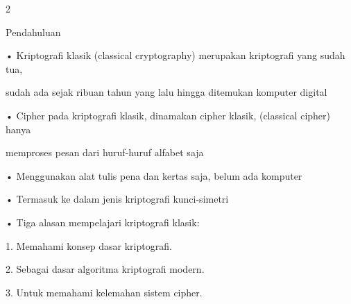 \documentclass{article}
\begin{document}

2

Pendahuluan

• Kriptografi klasik (classical cryptography) merupakan kriptografi yang sudah tua, 

sudah ada sejak ribuan tahun yang lalu hingga ditemukan komputer digital

• Cipher pada kriptografi klasik, dinamakan cipher klasik, (classical cipher) hanya 

memproses pesan dari huruf-huruf alfabet saja 

• Menggunakan alat tulis pena dan kertas saja, belum ada komputer

• Termasuk ke dalam jenis kriptografi kunci-simetri

• Tiga alasan mempelajari kriptografi klasik:

 1. Memahami konsep dasar kriptografi.

 2. Sebagai dasar algoritma kriptografi modern. 

 3. Untuk memahami kelemahan sistem cipher.
\end{document}

